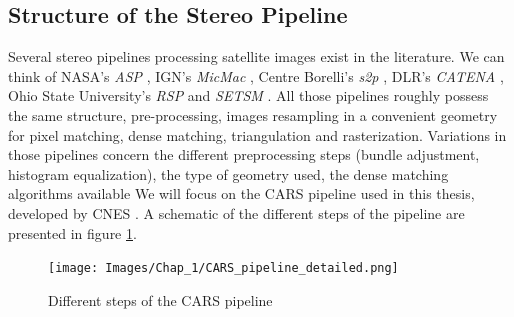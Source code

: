 \subsection{Structure of the Stereo Pipeline}
Several stereo pipelines processing satellite images exist in the literature. We can think of NASA's \textit{ASP} \cite{shean_automated_2016}, IGN's \textit{MicMac} \cite{rupnik_micmac_2017}, Centre Borelli's \textit{s2p} \cite{franchis_automatic_2014}, DLR's \textit{CATENA} \cite{kraus_fully_2013}, Ohio State University's \textit{RSP} and \textit{SETSM} \cite{qin_rpc_2016, noh_surface_2017}. All those pipelines roughly possess the same structure, \ie pre-processing, images resampling in a convenient geometry for pixel matching, dense matching, triangulation and rasterization. Variations in those pipelines concern the different preprocessing steps (bundle adjustment, histogram equalization), the type of geometry used, the dense matching algorithms available \etc{} We will focus on the CARS pipeline used in this thesis, developed by CNES \cite{michel_new_2020}. A schematic of the different steps of the pipeline are presented in figure \ref{fig:cars_pipeline}.
\begin{figure}
    \centering
    \texttt{[image: Images/Chap\_1/CARS\_pipeline\_detailed.png]}
    \caption{Different steps of the CARS pipeline}
    \label{fig:cars_pipeline}
\end{figure}

